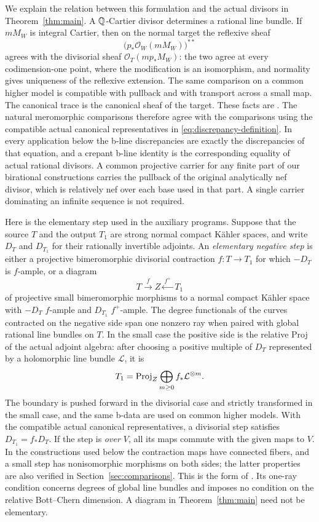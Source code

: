 We explain the relation between this formulation and the actual divisors in
Theorem~\ref{thm:main}.  A \(\mathbb{Q}\)-Cartier divisor determines a rational
line bundle.  If \(mM_W\) is integral Cartier, then on the normal target
the reflexive sheaf
\[
 \bigl(p_*\mathcal O_W(mM_W)\bigr)^{**}
\]
agrees with the divisorial sheaf \(\mathcal O_T(mp_*M_W)\): the two agree
at every codimension-one point, where the modification is an isomorphism,
and normality gives uniqueness of the reflexive extension.  The same
comparison on a common higher model is compatible with pullback and with
transport across a small map.  The canonical trace is the canonical
sheaf of the target.  These facts are
\cite[Lemma~9.3(i)--(ii)]{KahlerAuxiliary}.  The natural meromorphic
comparisons therefore agree with the comparisons using the compatible
actual canonical representatives in \eqref{eq:discrepancy-definition}.
In every application below the b-line discrepancies are exactly the
discrepancies of that equation, and a crepant b-line identity is the
corresponding equality of actual rational divisors.  A common projective
carrier for any finite part of our birational constructions carries the
pullback of the original analytically nef divisor, which is relatively nef
over each base used in that part.  A single carrier dominating an infinite
sequence is not required.

Here is the elementary step used in the auxiliary programs.  Suppose that
the source \(T\) and the output \(T_1\) are strong normal compact K\"ahler
spaces, and write \(D_T\) and \(D_{T_1}\) for their rationally invertible
adjoints.  An \emph{elementary negative step} is either a projective
bimeromorphic divisorial contraction \(f:T\to T_1\) for which \(-D_T\)
is \(f\)-ample, or a diagram
\[
 T\xrightarrow{\ f\ }Z\xleftarrow{\ f^+\ }T_1
\]
of projective small bimeromorphic morphisms to a normal compact K\"ahler
space with \(-D_T\) \(f\)-ample and \(D_{T_1}\) \(f^+\)-ample.  The
degree functionals of the curves contracted on the negative side span one
nonzero ray when paired with global rational line bundles on \(T\).
In the small case the positive side is the relative Proj of the actual
adjoint algebra: after choosing a positive multiple of \(D_T\) represented
by a holomorphic line bundle \(\mathcal L\), it is
\[
 T_1=\operatorname{Proj}_Z\bigoplus_{m\geq0} f_*\mathcal L^{\otimes m}.
\]
The boundary is pushed forward in the divisorial case and strictly
transformed in the small case, and the same b-data are used on common higher
models.  With the compatible actual canonical representatives, a divisorial
step satisfies \(D_{T_1}=f_*D_T\).  If the step is \emph{over \(V\)}, all its maps commute with the
given maps to \(V\).  In the constructions used below the contraction maps
have connected fibers, and a small step has nonisomorphic morphisms on both
sides; the latter properties are also verified in
Section~\ref{sec:comparisons}.  This is the form of
\cite[Definition~9.6]{KahlerAuxiliary}.  Its one-ray condition concerns
degrees of global line bundles and imposes no condition on the relative
Bott--Chern dimension.  A diagram in Theorem~\ref{thm:main} need not be
elementary.

